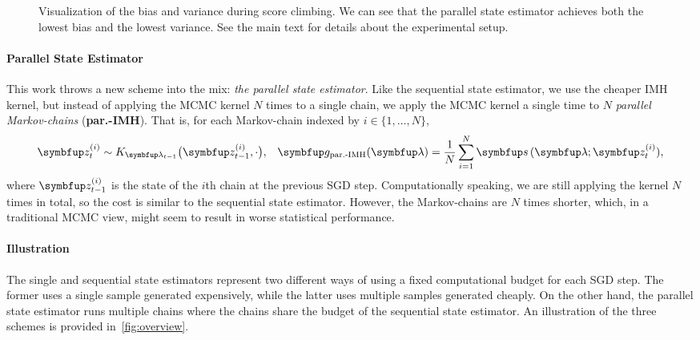 \begin{figure}
    \vspace{-0.3in}
    \centering
    
    \vspace{-0.3in}
    \caption{Visualization of the bias and variance during score climbing.
      We can see that the parallel state estimator achieves both the lowest bias and the lowest variance.
      See the main text for details about the experimental setup.
    }\label{fig:gaussian}
    \vspace{-0.15in}
\end{figure}

\vspace{-0.08in}
\paragraph{Parallel State Estimator}
This work throws a new scheme into the mix: \textit{the parallel state estimator}.
Like the sequential state estimator, we use the cheaper IMH kernel, but instead of applying the MCMC kernel \(N\) times to a single chain, we apply the MCMC kernel a single time to \(N\) \textit{parallel Markov-chains} (\textbf{par.-IMH}).
That is, for each Markov-chain indexed by \(i \in \{1, \ldots, N\}\),
%
\vspace{-0.05in}
\begin{align*}
  &\vz_{t}^{(i)} \sim K_{\vlambda_{t-1}}\big(\vz_{t-1}^{(i)}, \cdot \big),
  &\vg_{\text{par.-IMH}}(\vlambda) = \frac{1}{N} \sum_{i=1}^N \vs\,(\vlambda; \vz_{t}^{(i)}),
\end{align*}
%
where \(\vz_{t-1}^{(i)}\) is the state of the \(i\)th chain at the previous SGD step.
Computationally speaking, we are still applying the kernel \(N\) times in total, so the cost is similar to the sequential state estimator.
However, the Markov-chains are \(N\) times shorter, which, in a traditional MCMC view, might seem to result in worse statistical performance.

\vspace{-0.08in}
\paragraph{Illustration}
The single and sequential state estimators represent two different ways of using a fixed computational budget for each SGD step.
The former uses a single sample generated expensively, while the latter uses multiple samples generated cheaply.
On the other hand, the parallel state estimator runs multiple chains where the chains share the budget of the sequential state estimator.
An illustration of the three schemes is provided in~\cref{fig:overview}.

